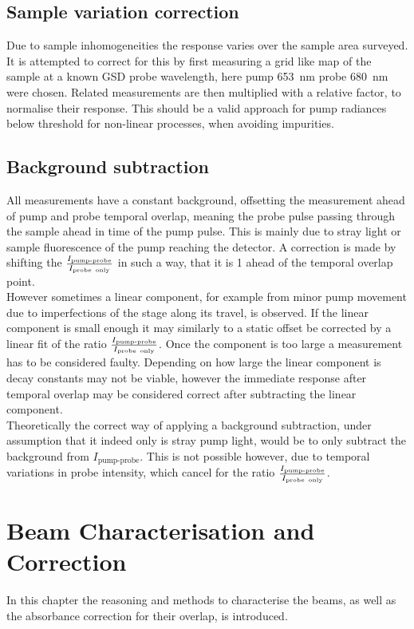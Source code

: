 \documentclass[twoside,openright,listof=numbered]{scrreprt}
\begin{document}
\section{Sample variation correction}
Due to sample inhomogeneities  the response varies over the sample area surveyed. It is attempted to correct for this by first measuring a grid like map of the sample at a known GSD probe wavelength, here pump \qty{653}{\nano\meter} probe \qty{680}{\nano\meter} were chosen. Related measurements are then multiplied with a relative factor, to normalise their response. This should be a valid approach for pump radiances below threshold for non-linear processes, when avoiding impurities.

\section{Background subtraction}
All measurements have a constant background, offsetting the measurement ahead of pump and probe temporal overlap, meaning the probe pulse passing through the sample ahead in time of the pump pulse. This is mainly due to stray light or sample fluorescence of the pump reaching the detector.  A correction is made by shifting the ${\frac{I_\text{pump-probe}}{I_\text{probe\, only}}}$ in such a way, that it is 1 ahead of the temporal overlap point. \\
However sometimes a linear component, for example from minor pump movement due to imperfections of the stage along its travel, is observed. If the linear component is small enough it may similarly to a static offset be corrected by a linear fit of the ratio ${\frac{I_\text{pump-probe}}{I_\text{probe\, only}}}$. Once the component is too large a measurement has to be considered faulty. Depending on how large the linear component is decay constants may not be viable, however the immediate response after temporal overlap may be considered correct after subtracting the linear component.\\

Theoretically the correct way of applying a background subtraction, under assumption that it indeed only is stray pump light, would be to only subtract the background from ${I_\text{pump-probe}}$. This is not possible however, due to temporal variations in probe intensity, which cancel for the ratio ${\frac{I_\text{pump-probe}}{I_\text{probe\, only}}}$.



\chapter{Beam Characterisation and Correction}\label{chp:OverlapCorrection}
In this chapter the reasoning and methods to characterise the beams, as well as the absorbance correction for their overlap, is introduced.
\end{document}
